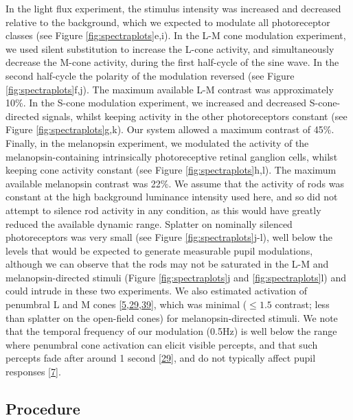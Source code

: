 \documentclass[
]{article}
\begin{document}
In the light flux experiment, the stimulus intensity was increased and decreased relative to the background, which we expected to modulate all photoreceptor classes (see Figure \ref{fig:spectraplots}e,i). In the L-M cone modulation experiment, we used silent substitution to increase the L-cone activity, and simultaneously decrease the M-cone activity, during the first half-cycle of the sine wave. In the second half-cycle the polarity of the modulation reversed (see Figure \ref{fig:spectraplots}f,j). The maximum available L-M contrast was approximately 10\%. In the S-cone modulation experiment, we increased and decreased S-cone-directed signals, whilst keeping activity in the other photoreceptors constant (see Figure \ref{fig:spectraplots}g,k). Our system allowed a maximum contrast of 45\%. Finally, in the melanopsin experiment, we modulated the activity of the melanopsin-containing intrinsically photoreceptive retinal ganglion cells, whilst keeping cone activity constant (see Figure \ref{fig:spectraplots}h,l). The maximum available melanopsin contrast was 22\%. We assume that the activity of rods was constant at the high background luminance intensity used here, and so did not attempt to silence rod activity in any condition, as this would have greatly reduced the available dynamic range. Splatter on nominally silenced photoreceptors was very small (see Figure \ref{fig:spectraplots}j-l), well below the levels that would be expected to generate measurable pupil modulations, although we can observe that the rods may not be saturated in the L-M and melanopsin-directed stimuli (Figure \ref{fig:spectraplots}j and \ref{fig:spectraplots}l) and could intrude in these two experiments. We also estimated activation of penumbral L and M cones {[}\protect\hyperlink{ref-Barrionuevo2016}{5},\protect\hyperlink{ref-Spitschan2015}{29},\protect\hyperlink{ref-Zele2019}{39}{]}, which was minimal (\(\le 1.5%
\) contrast; less than splatter on the open-field cones) for melanopsin-directed stimuli. We note that the temporal frequency of our modulation (0.5Hz) is well below the range where penumbral cone activation can elicit visible percepts, and that such percepts fade after around 1 second {[}\protect\hyperlink{ref-Spitschan2015}{29}{]}, and do not typically affect pupil responses {[}\protect\hyperlink{ref-Spitschan2014}{7}{]}.

\hypertarget{procedure}{%
\subsection{Procedure}\label{procedure}}
\end{document}
